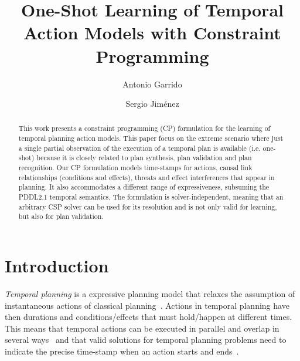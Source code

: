 \documentclass{ecai}
\begin{document}
\title{One-Shot Learning of Temporal Action Models with Constraint Programming}
\author{Antonio Garrido \and Sergio Jim\'enez}
 
\maketitle

\begin{abstract}
  This work presents a constraint programming (CP) formulation for the learning of temporal planning action models. This paper focus on the extreme scenario where just a single partial observation of the execution of a temporal plan is available (i.e. one-shot) because it is closely related to plan synthesis, plan validation and plan recognition. Our CP formulation models time-stamps for actions, causal link relationships (conditions and effects), threats and effect interferences that appear in planning. It also accommodates a different range of expressiveness, subsuming the PDDL2.1 temporal semantics. The formulation is solver-independent, meaning that an arbitrary CSP solver can be used for its resolution and is not only valid for learning, but also for plan validation. 
\end{abstract}


\section{Introduction}
{\em Temporal planning} is a expressive planning model that relaxes the assumption of instantaneous actions of classical planning~\cite{fox2003pddl2}. Actions in temporal planning have then durations and conditions/effects that must hold/happen at different times. This means that temporal actions can be executed in parallel and overlap in several ways~\cite{cushing2007temporal} and that valid solutions for temporal planning problems need to indicate the precise time-stamp when an action starts and ends~\cite{howey2004val}.
\end{document}
